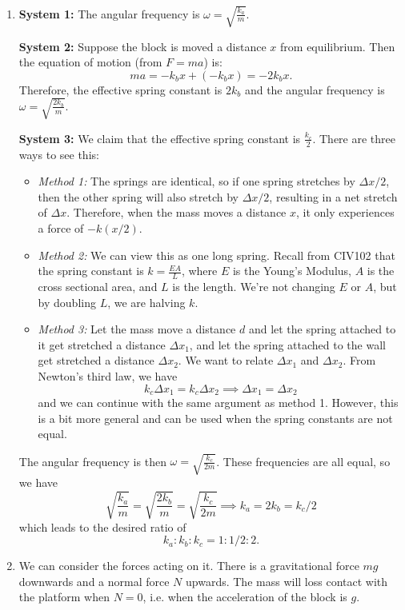 \documentclass{article}
\begin{document}
\begin{enumerate}
    \newpage
    \item \textbf{System 1:} The angular frequency is $\omega = \sqrt{\frac{k_a}{m}}.$ 
    
    \textbf{System 2:} Suppose the block is moved a distance $x$ from equilibrium. Then the equation of motion (from $F=ma$) is: 
    $$ma = -k_bx + (-k_bx) = -2k_bx.$$
    Therefore, the effective spring constant is $2k_b$ and the angular frequency is $\omega = \sqrt{\frac{2k_b}{m}}.$

    \textbf{System 3:} We claim that the effective spring constant is $\frac{k_c}{2}$. There are three ways to see this: 
    \begin{itemize}
        \item \textit{Method 1:} The springs are identical, so if one spring stretches by $\Delta x/2$, then the other spring will also stretch by $\Delta x/2$, resulting in a net stretch of $\Delta x$. Therefore, when the mass moves a distance $x$, it only experiences a force of $-k(x/2).$
        \item \textit{Method 2:} We can view this as one long spring. Recall from CIV102 that the spring constant is $k = \frac{EA}{L}$, where $E$ is the Young's Modulus, $A$ is the cross sectional area, and $L$ is the length. We're not changing $E$ or $A$, but by doubling $L$, we are halving $k.$
        \item \textit{Method 3:} Let the mass move a distance $d$ and let the spring attached to it get stretched a distance $\Delta x_1$, and let the spring attached to the wall get stretched a distance $\Delta x_2$. We want to relate $\Delta x_1$ and $\Delta x_2$. From Newton's third law, we have 
        \begin{equation*}
            k_c\Delta x_1 = k_c \Delta x_2 \implies \Delta x_1 = \Delta x_2
        \end{equation*}
        and we can continue with the same argument as method 1. However, this is a bit more general and can be used when the spring constants are not equal.
    \end{itemize}
    The angular frequency is then $\omega = \sqrt{\frac{k_c}{2m}}$. These frequencies are all equal, so we have 
    \begin{equation*}
        \sqrt{\frac{k_a}{m}} = \sqrt{\frac{2k_b}{m}} = \sqrt{\frac{k_c}{2m}} \implies k_a = 2k_b = k_c/2
    \end{equation*}
    which leads to the desired ratio of 
    \begin{equation*}
        \boxed{k_a:k_b:k_c = 1:1/2:2.}
    \end{equation*}
    \item We can consider the forces acting on it. There is a gravitational force $mg$ downwards and a normal force $N$ upwards. The mass will loss contact with the platform when $N=0$, i.e. when the acceleration of the block is $g$.
    

\end{enumerate}
\end{document}

